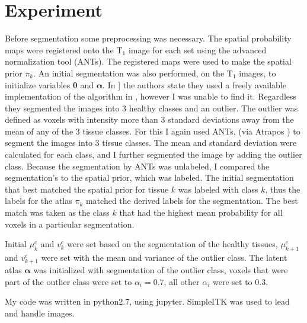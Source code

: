 \documentclass[10pt,twocolumn,letterpaper]{article}
\begin{document}
\section{Experiment}
Before segmentation some preprocessing was necessary. The spatial probability maps were registered onto the T$_{\text{1}}$ image for each set using the advanced normalization tool (ANTs). The registered maps were used to make the spatial prior $\pi_k$. An initial segmentation was also performed, on the T$_{\text{1}}$ images, to initialize variables $\boldsymbol{\theta}$ and $\boldsymbol{\alpha}$.  In \cite{Menze2010}] the authors state they used a freely available implementation of the algorithm in \cite{leemput}, however I was unable to find it. Regardless they segmented the images into 3 healthy classes and an outlier. The outlier was defined as voxels with intensity more than 3 standard deviations away from the mean of any of the 3 tissue classes. For this I again used ANTs, (via Atrapos \cite{atropos}) to segment the images into 3 tissue classes. The mean and standard deviation were calculated for each class, and I further segmented the image by adding the outlier class. Because the segmentation by ANTs was unlabeled, I compared the segmentation's to the spatial prior, which was labeled. The initial segmentation that best matched the spatial prior for tissue $k$ was labeled with class $k$, thus the labels for the atlas $\pi_k$ matched the derived labels for the segmentation. The best match was taken as the class $k$ that had the highest mean probability for all voxels in a particular segmentation. 

Initial $\mu_k^c$ and $v_k^c$ were set based on the segmentation of the healthy tissues, $\mu_{k+1}^c$ and $v_{k+1}^c$ were set with the mean and variance of the outlier class. The latent atlas $\boldsymbol{\alpha}$ was initialized with segmentation of the outlier class, voxels that were part of the outlier class were set to $\alpha_i=0.7$, all other $\alpha_i$ were set to 0.3.

My code was written in python2.7, using jupyter. SimpleITK was used to lead and handle images.
\end{document}
